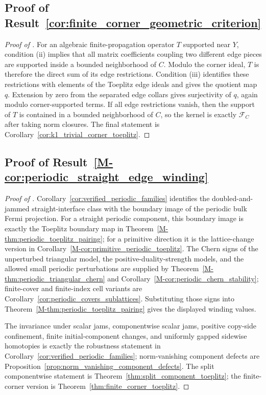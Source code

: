 \documentclass[11pt]{article}
\numberwithin{equation}{section}
\theoremstyle{definition}
\theoremstyle{remark}
\begin{document}
\subsection{Proof of Result~\ref{cor:finite_corner_geometric_criterion}}\label{app:proof:cor:finite_corner_geometric_criterion}
\begin{proof}[Proof of ]
For an algebraic finite-propagation operator \(T\) supported near \(Y\), condition (ii) implies that
all matrix coefficients coupling two different edge pieces are supported inside a bounded
neighborhood of \(C\). Modulo the corner ideal, \(T\) is therefore the direct sum of its edge
restrictions. Condition (iii) identifies these restrictions with elements of the Toeplitz edge
ideals and gives the quotient map \(q\). Extension by zero from the separated edge collars gives
surjectivity of \(q\), again modulo corner-supported terms. If all edge restrictions vanish, then
the support of \(T\) is contained in a bounded neighborhood of \(C\), so the kernel is exactly
\(\mathcal F_C\) after taking norm closures. The final statement is
Corollary~\ref{cor:k1_trivial_corner_toeplitz}.
\end{proof}

\subsection{Proof of Result~\ref{M-cor:periodic_straight_edge_winding}}\label{app:proof:cor:periodic_straight_edge_winding}
\begin{proof}[Proof of ]
Corollary~\ref{cor:verified_periodic_families} identifies the doubled-and-jammed straight-interface
class with the boundary image of the periodic bulk Fermi projection. For a straight periodic
component, this boundary image is exactly the Toeplitz boundary map in
Theorem~\ref{M-thm:periodic_toeplitz_pairing}; for a primitive direction it is the lattice-change
version in Corollary~\ref{M-cor:primitive_periodic_toeplitz}. The Chern signs of the unperturbed
triangular model, the positive-duality-strength models, and the allowed small periodic
perturbations are supplied by Theorem~\ref{M-thm:periodic_triangular_chern} and
Corollary~\ref{M-cor:periodic_chern_stability}; finite-cover and finite-index cell variants are
Corollary~\ref{cor:periodic_covers_sublattices}.
Substituting those signs into Theorem~\ref{M-thm:periodic_toeplitz_pairing} gives the displayed
winding values.

The invariance under scalar jams, componentwise scalar jams, positive copy-side confinement,
finite initial-component changes, and uniformly gapped sidewise homotopies is exactly the
robustness statement in Corollary~\ref{cor:verified_periodic_families}; norm-vanishing component
defects are Proposition~\ref{prop:norm_vanishing_component_defects}. The split componentwise
statement is Theorem~\ref{thm:split_component_toeplitz}; the finite-corner version is
Theorem~\ref{thm:finite_corner_toeplitz}.
\end{proof}
\end{document}
